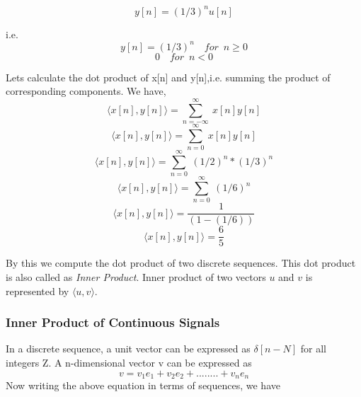 	 \begin{equation*} y[n] = (1/3)^nu[n] \end{equation*}
    
    i.e. 
    \begin{equation*}y[n] = (1/3)^n	\enspace \enspace	for\enspace n\geq0\end{equation*} \begin{equation*}0\enspace \enspace			for\enspace n<0 \end{equation*}
                  
                  
  Lets calculate the dot product of x[n] and y[n],i.e. summing the product of corresponding components.
  We have,
   \begin{equation*} \langle x[n],y[n] \rangle = \sum_{n=-\infty}^{\infty}\ x[n]y[n]\end{equation*} 
   \begin{equation*} \langle x[n],y[n] \rangle = \sum_{n=0}^{\infty}\ x[n]y[n]\end{equation*} 
   \begin{equation*} \langle x[n],y[n] \rangle = \sum_{n=0}^{\infty}\ (1/2)^n*(1/3)^n\end{equation*} 
   \begin{equation*} \langle x[n],y[n] \rangle = \sum_{n=0}^{\infty}\ (1/6)^n\end{equation*} 
   \begin{equation*} \langle x[n],y[n] \rangle = \frac{1}{(1-(1/6))}\end{equation*} 
   \begin{equation*} \langle x[n],y[n] \rangle = \frac{6}{5}\end{equation*} 
  		
          
 	By this we compute the dot product of two discrete sequences. This dot product is also called as \textit{Inner Product}. Inner product of two vectors $u$ and $v$ is represented by $\langle u,v \rangle$.

\subsubsection{Inner Product of Continuous Signals}
       In a discrete sequence, a unit vector can be expressed as $\delta[n-N]$ for all integers Z. A n-dimensional vector v can be expressed as
        \begin{equation*}v = v_1e_1 + v_2e_2 + ........ + v_ne_n\end{equation*}
        Now writing the above equation in terms of sequences, we have
       
